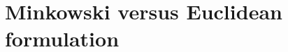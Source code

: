 \documentclass[12pt]{article}
\renewcommand{\theequation}{\thesection.\arabic{equation}}
\begin{document}

\section{Minkowski versus Euclidean formulation}
 \renewcommand{\theequation}{\Alph{section}.\arabic{equation}}
\setcounter{equation}{0}
 
 \renewcommand{\thesubsection}{\Alph{section}.\arabic{subsection}}
\setcounter{subsection}{0}
\label{app:mink}
\end{document}
